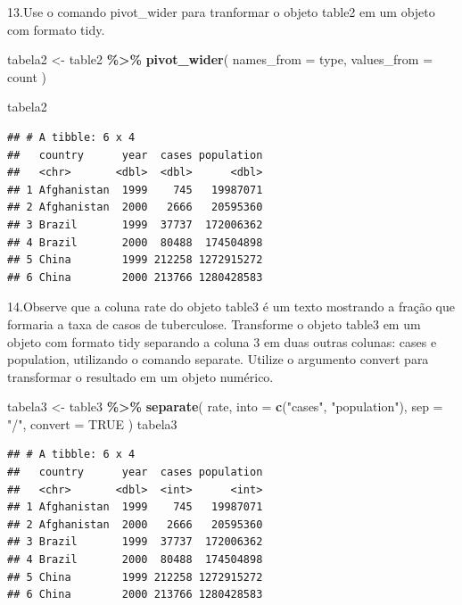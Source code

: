 \documentclass[
]{article}
\newenvironment{Shaded}{\begin{snugshade}}{\end{snugshade}}
\newcommand{\AttributeTok}[1]{\textcolor[rgb]{0.13,0.29,0.53}{#1}}
\newcommand{\ConstantTok}[1]{\textcolor[rgb]{0.56,0.35,0.01}{#1}}
\newcommand{\FunctionTok}[1]{\textcolor[rgb]{0.13,0.29,0.53}{\textbf{#1}}}
\newcommand{\NormalTok}[1]{#1}
\newcommand{\OtherTok}[1]{\textcolor[rgb]{0.56,0.35,0.01}{#1}}
\newcommand{\SpecialCharTok}[1]{\textcolor[rgb]{0.81,0.36,0.00}{\textbf{#1}}}
\newcommand{\StringTok}[1]{\textcolor[rgb]{0.31,0.60,0.02}{#1}}
\begin{document}
13.Use o comando pivot\_wider para tranformar o objeto table2 em um
objeto com formato tidy.

\begin{Shaded}
\begin{Highlighting}[]
\NormalTok{tabela2 }\OtherTok{\textless{}{-}}\NormalTok{ table2 }\SpecialCharTok{\%\textgreater{}\%} 
            \FunctionTok{pivot\_wider}\NormalTok{(}
              \AttributeTok{names\_from =}\NormalTok{ type,}
              \AttributeTok{values\_from =}\NormalTok{ count}
\NormalTok{            )}

\NormalTok{tabela2}
\end{Highlighting}
\end{Shaded}

\begin{verbatim}
## # A tibble: 6 x 4
##   country      year  cases population
##   <chr>       <dbl>  <dbl>      <dbl>
## 1 Afghanistan  1999    745   19987071
## 2 Afghanistan  2000   2666   20595360
## 3 Brazil       1999  37737  172006362
## 4 Brazil       2000  80488  174504898
## 5 China        1999 212258 1272915272
## 6 China        2000 213766 1280428583
\end{verbatim}

14.Observe que a coluna rate do objeto table3 é um texto mostrando a
fração que formaria a taxa de casos de tuberculose. Transforme o objeto
table3 em um objeto com formato tidy separando a coluna 3 em duas outras
colunas: cases e population, utilizando o comando separate. Utilize o
argumento convert para transformar o resultado em um objeto numérico.

\begin{Shaded}
\begin{Highlighting}[]
\NormalTok{tabela3 }\OtherTok{\textless{}{-}}\NormalTok{ table3 }\SpecialCharTok{\%\textgreater{}\%} 
            \FunctionTok{separate}\NormalTok{(}
\NormalTok{              rate,}
              \AttributeTok{into =} \FunctionTok{c}\NormalTok{(}\StringTok{"cases"}\NormalTok{, }\StringTok{"population"}\NormalTok{),}
              \AttributeTok{sep =} \StringTok{"/"}\NormalTok{,}
              \AttributeTok{convert =} \ConstantTok{TRUE}
\NormalTok{            )}
\NormalTok{tabela3}
\end{Highlighting}
\end{Shaded}

\begin{verbatim}
## # A tibble: 6 x 4
##   country      year  cases population
##   <chr>       <dbl>  <int>      <int>
## 1 Afghanistan  1999    745   19987071
## 2 Afghanistan  2000   2666   20595360
## 3 Brazil       1999  37737  172006362
## 4 Brazil       2000  80488  174504898
## 5 China        1999 212258 1272915272
## 6 China        2000 213766 1280428583
\end{verbatim}
\end{document}
